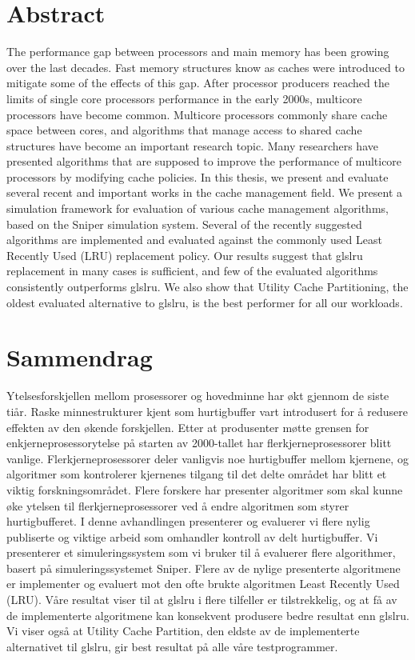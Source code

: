 
\section*{Abstract}

The performance gap between processors and main memory has been growing over the last decades.
Fast memory structures know as caches were introduced to mitigate some of the effects of this gap.
After processor producers reached the limits of single core processors performance in the early 2000s, multicore processors have become common.
Multicore processors commonly share cache space between cores, and algorithms that manage access to shared cache structures have become an important research topic.
Many researchers have presented algorithms that are supposed to improve the performance of multicore processors by modifying cache policies.
In this thesis, we present and evaluate several recent and important works in the cache management field.
We present a simulation framework for evaluation of various cache management algorithms, based on the Sniper simulation system.
Several of the recently suggested algorithms are implemented and evaluated against the commonly used Least Recently Used (LRU) replacement policy.
Our results suggest that gls{lru} replacement in many cases is sufficient, and few of the evaluated algorithms consistently outperforms gls{lru}.
We also show that Utility Cache Partitioning, the oldest evaluated alternative to gls{lru}, is the best performer for all our workloads.

\clearpage

\section*{Sammendrag}
Ytelsesforskjellen mellom prosessorer og hovedminne har økt gjennom de siste tiår.
Raske minnestrukturer kjent som hurtigbuffer vart introdusert for å redusere effekten av den økende forskjellen.
Etter at produsenter møtte grensen for enkjerneprosessorytelse på starten av 2000-tallet har flerkjerneprosessorer blitt vanlige.
Flerkjerneprosessorer deler vanligvis noe hurtigbuffer mellom kjernene, og algoritmer som kontrolerer kjernenes tilgang til det delte området har blitt et viktig forskningsområdet.
Flere forskere har presenter algoritmer som skal kunne øke ytelsen til flerkjerneprosessorer ved å endre algoritmen som styrer hurtigbufferet.
I denne avhandlingen presenterer og evaluerer vi flere nylig publiserte og viktige arbeid som omhandler kontroll av delt hurtigbuffer.
Vi presenterer et simuleringssystem som vi bruker til å evaluerer flere algorithmer, basert på simuleringssystemet Sniper.
Flere av de nylige presenterte algoritmene er implementer og evaluert mot den ofte brukte algoritmen Least Recently Used (LRU).
Våre resultat viser til at gls{lru} i flere tilfeller er tilstrekkelig, og at få av de implementerte algoritmene kan konsekvent produsere bedre resultat enn gls{lru}.
Vi viser også at Utility Cache Partition, den eldste av de implementerte alternativet til gls{lru}, gir best resultat på alle våre testprogrammer.

\clearpage
